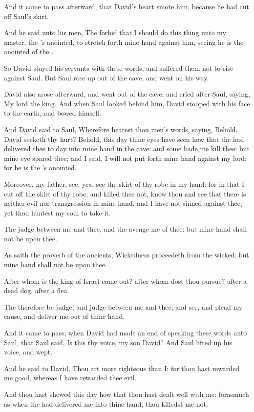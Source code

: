 \Verse And it came to pass afterward, that David's heart smote him, because he had cut off Saul's skirt.

\Verse And he said unto his men, The \LORD forbid that I should do this thing unto my master, the \LORD's anointed, to stretch forth mine hand against him, seeing he is the anointed of the \LORD.

\Verse So David stayed his servants with these words, and suffered them not to rise against Saul. But Saul rose up out of the cave, and went on his way.

\Verse David also arose afterward, and went out of the cave, and cried after Saul, saying, My lord the king. And when Saul looked behind him, David stooped with his face to the earth, and bowed himself.

\Verse And David said to Saul, Wherefore hearest thou men's words, saying, Behold, David seeketh thy hurt?  \Verse Behold, this day thine eyes have seen how that the \LORD had delivered thee to day into mine hand in the cave: and some bade me kill thee: but mine eye spared thee; and I said, I will not put forth mine hand against my lord; for he is the \LORD's anointed.

\Verse Moreover, my father, see, yea, see the skirt of thy robe in my hand: for in that I cut off the skirt of thy robe, and killed thee not, know thou and see that there is neither evil nor transgression in mine hand, and I have not sinned against thee; yet thou huntest my soul to take it.

\Verse The \LORD judge between me and thee, and the \LORD avenge me of thee: but mine hand shall not be upon thee.

\Verse As saith the proverb of the ancients, Wickedness proceedeth from the wicked: but mine hand shall not be upon thee.

\Verse After whom is the king of Israel come out? after whom dost thou pursue? after a dead dog, after a flea.

\Verse The \LORD therefore be judge, and judge between me and thee, and see, and plead my cause, and deliver me out of thine hand.

\Verse And it came to pass, when David had made an end of speaking these words unto Saul, that Saul said, Is this thy voice, my son David? And Saul lifted up his voice, and wept.

\Verse And he said to David, Thou art more righteous than I: for thou hast rewarded me good, whereas I have rewarded thee evil.

\Verse And thou hast shewed this day how that thou hast dealt well with me: forasmuch as when the \LORD had delivered me into thine hand, thou killedst me not.

